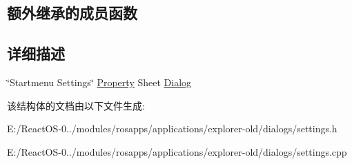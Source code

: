 \subsection*{额外继承的成员函数}


\subsection{详细描述}
\char`\"{}\+Startmenu Settings\char`\"{} \hyperlink{struct_property}{Property} Sheet \hyperlink{struct_dialog}{Dialog} 

该结构体的文档由以下文件生成\+:\begin{DoxyCompactItemize}
\item 
E\+:/\+React\+O\+S-\/0../modules/rosapps/applications/explorer-\/old/dialogs/settings.\+h\item 
E\+:/\+React\+O\+S-\/0../modules/rosapps/applications/explorer-\/old/dialogs/settings.\+cpp\end{DoxyCompactItemize}
